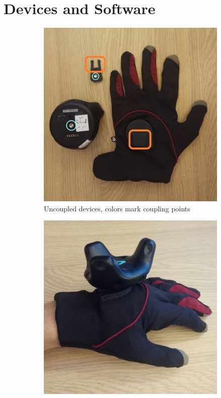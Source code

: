 \documentclass[hyperref, bachelorofscience]{cgvpub}
\begin{document}
\section{Devices and Software}
\begin{figure}
	\begin{subfigure}{.49\linewidth}
		\includegraphics[width=\linewidth]{../pics/devices_uncoupled}
		\caption{Uncoupled devices, colors mark coupling points}
		\label{fig:devices:unc}
	\end{subfigure}
	\hfill
	\begin{subfigure}{.49\linewidth}
		\includegraphics[width=\linewidth]{../pics/devices_coupled}

\end{subfigure}
\end{figure}
\end{document}
